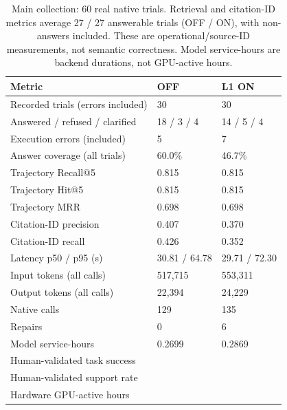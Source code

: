 \begin{table}[H]\centering\footnotesize
\begin{tabularx}{\textwidth}{@{}L{5.0cm}XX@{}}\toprule Metric & OFF & L1 ON\\\midrule
Recorded trials (errors included) & 30 & 30\\
Answered / refused / clarified & 18 / 3 / 4 & 14 / 5 / 4\\
Execution errors (included) & 5 & 7\\
Answer coverage (all trials) & 60.0\% & 46.7\%\\
Trajectory Recall@5 & 0.815 & 0.815\\
Trajectory Hit@5 & 0.815 & 0.815\\
Trajectory MRR & 0.698 & 0.698\\
Citation-ID precision & 0.407 & 0.370\\
Citation-ID recall & 0.426 & 0.352\\
Latency p50 / p95 (s) & 30.81 / 64.78 & 29.71 / 72.30\\
Input tokens (all calls) & 517,715 & 553,311\\
Output tokens (all calls) & 22,394 & 24,229\\
Native calls & 129 & 135\\
Repairs & 0 & 6\\
Model service-hours & 0.2699 & 0.2869\\
Human-validated task success &  & \\
Human-validated support rate &  & \\
Hardware GPU-active hours &  & \\
\bottomrule\end{tabularx}
\caption{Main collection: 60 real native trials. Retrieval and citation-ID metrics average 27 / 27 answerable trials (OFF / ON), with non-answers included. These are operational/source-ID measurements, not semantic correctness. Model service-hours are backend durations, not GPU-active hours.}
\end{table}
